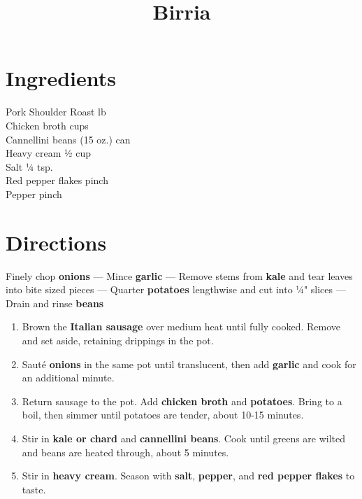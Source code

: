 \documentclass[11pt,letterpaper]{article}
\title{Birria}
\author{}
\date{}
\begin{document}
\maketitle
\thispagestyle{empty}

\section*{Ingredients}
\setlength{\columnsep}{20pt}
\begin{multicols}{2}
\noindent
	Pork Shoulder Roast  lb \\
    \columnbreak
    Chicken broth  cups \\
    Cannellini beans  (15 oz.) can \\
    Heavy cream \dotfill ½ cup \\
    Salt \dotfill ¼ tsp. \\
    Red pepper flakes \dotfill pinch \\
    Pepper \dotfill pinch \\
\end{multicols}

\section*{Directions}

\noindent
Finely chop \textbf{onions} ---
Mince \textbf{garlic} ---
Remove stems from \textbf{kale} and tear leaves into bite sized pieces ---
Quarter \textbf{potatoes} lengthwise and cut into ¼" slices ---
Drain and rinse \textbf{beans}

\begin{enumerate}
    \item Brown the \textbf{Italian sausage} over medium heat until fully cooked. Remove and set aside, retaining drippings in the pot.
    \item Sauté \textbf{onions} in the same pot until translucent, then add \textbf{garlic} and cook for an additional minute.
    \item Return sausage to the pot. Add \textbf{chicken broth} and \textbf{potatoes}. Bring to a boil, then simmer until potatoes are tender, about 10-15 minutes.
    \item Stir in \textbf{kale or chard} and \textbf{cannellini beans}. Cook until greens are wilted and beans are heated through, about 5 minutes.
    \item Stir in \textbf{heavy cream}. Season with \textbf{salt}, \textbf{pepper}, and \textbf{red pepper flakes} to taste.
\end{enumerate}
\end{document}
